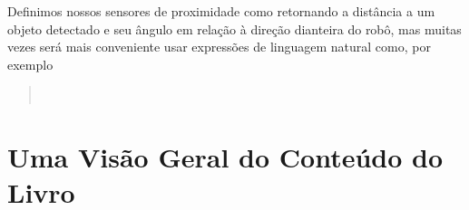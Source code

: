 Definimos nossos sensores de proximidade como retornando a distância a um objeto detectado e seu ângulo em relação à direção dianteira do robô, mas muitas vezes será mais conveniente usar expressões de linguagem natural como, por exemplo
\begin{quote}
\\
\end{quote}

\section{Uma Visão Geral do Conteúdo do Livro}\label{s.overview}







